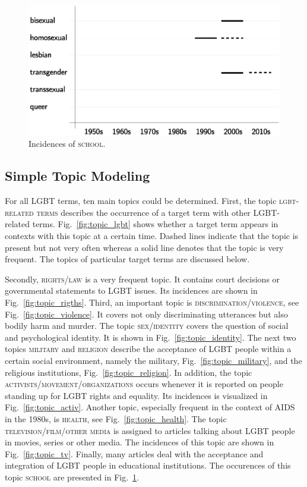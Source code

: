 \documentclass[10pt,a4paper,twocolumn]{scrartcl}
\begin{document}
\begin{figure}
\begin{minipage}{0.48\textwidth}
\includegraphics[width=\columnwidth]{figures/topic_school}
\caption{Incidences of \textsc{school}.} \label{fig:topic_school}
\end{minipage}
\end{figure}

\subsection{Simple Topic Modeling}
For all LGBT terms, ten main topics could be determined. First, the topic \textsc{lgbt-related terms} describes the occurrence of a target term with other LGBT-related terms. Fig.~\ref{fig:topic_lgbt} shows whether a target term appears in contexts with this topic at a certain time. Dashed lines indicate that the topic is present but not very often whereas a solid line denotes that the topic is very frequent. The topics of particular target terms are discussed below.

Secondly, \textsc{rights/law} is a very frequent topic. It contains court decisions or governmental statements to LGBT issues. Its incidences are shown in Fig.~\ref{fig:topic_rigths}. Third, an important topic is \textsc{discrimination/violence}, see Fig.~\ref{fig:topic_violence}. It covers not only discriminating utterances but also bodily harm and murder. The topic \textsc{sex/identity} covers the question of social and psychological identity. It is shown in Fig.~\ref{fig:topic_identity}. The next two topics \textsc{military} and \textsc{religion} describe the acceptance of LGBT people within a certain social environment, namely the military, Fig.~\ref{fig:topic_military}, and the religious institutions, Fig.~\ref{fig:topic_religion}. In addition, the topic \textsc{activists/movement/organizations} occurs whenever it is reported on people standing up for LGBT rights and equality. Its incidences is visualized in Fig.~\ref{fig:topic_activ}. Another topic, especially frequent in the context of AIDS in the 1980s, is \textsc{health}, see Fig.~\ref{fig:topic_health}. The topic \textsc{television/film/other media} is assigned to articles talking about LGBT people in movies, series or other media. The incidences of this topic are shown in Fig.~\ref{fig:topic_tv}. Finally, many articles deal with the acceptance and integration of LGBT people in educational institutions. The occurences of this topic \textsc{school} are presented in Fig.~\ref{fig:topic_school}.
\end{document}
